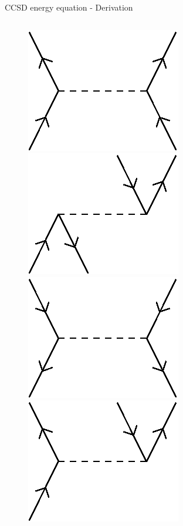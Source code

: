 \begin{frame}{CCSD energy equation - Derivation }
\begin{columns}[t]
\begin{figure}
        \parbox{0.20\textwidth}{
            \centering
            \includegraphics[scale=0.35]{graphics/v4}} 
        \parbox{0.20\textwidth}{
            \centering
            \includegraphics[scale=0.35]{graphics/v5}} 
        \parbox{0.20\textwidth}{
            \centering
            \includegraphics[scale=0.35]{graphics/v6}} 
        \parbox{0.20\textwidth}{
            \centering
            \includegraphics[scale=0.35]{graphics/v7}} 

\end{figure}
\end{columns}
\end{frame}
